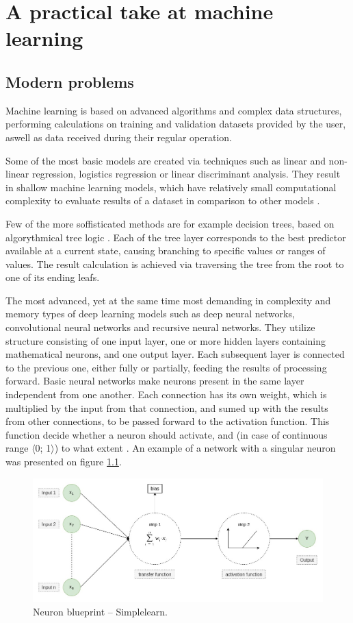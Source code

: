 \chapter{A practical take at machine learning}
\section{Modern problems}

Machine learning is based on advanced algorithms and complex data structures, performing calculations on training and validation datasets provided by the user, aswell as data received during their regular operation.

Some of the most basic models are created via techniques such as linear and non-linear regression, logistics regression or linear discriminant analysis. They result in shallow machine learning models, which have relatively small computational complexity to evaluate results of a dataset in comparison to other models \cite{shallow}.

Few of the more soffisticated methods are for example decision trees, based on algorythmical tree logic \cite{tree}. Each of the tree layer corresponds to the best predictor available at a current state, causing branching to specific values or ranges of values. The result calculation is achieved via traversing the tree from the root to one of its ending leafs. 

The most advanced, yet at the same time most demanding in complexity and memory types of deep learning models such as deep neural networks, convolutional neural networks and recursive neural networks. They utilize structure consisting of one input layer, one or more hidden layers containing mathematical neurons, and one output layer. Each subsequent layer is connected to the previous one, either fully or partially, feeding the results of processing forward. Basic neural networks make neurons present in the same layer independent from one another. Each connection has its own weight, which is multiplied by the input from that connection, and sumed up with the results from other connections, to be passed forward to the activation function. This function decide whether a neuron should activate, and (in case of continuous range $\langle$0; 1$\rangle$) to what extent \cite{mit_neural}. An example of a network with a singular neuron was presented on figure \ref{fig:nn}.

\begin{figure}[!ht]
    \centering
    \includegraphics[width=150mm]{Rysunki/Rozdzial2/perceptron.jpg}
    \caption{Neuron blueprint -- Simplelearn.}
    \label{fig:nn}
\end{figure}

